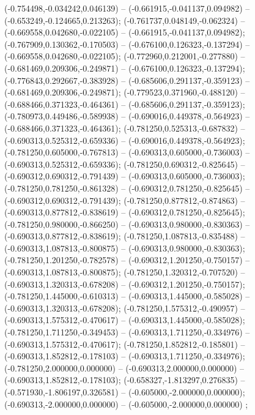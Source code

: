  (-0.754498,-0.034242,0.046139) -- (-0.661915,-0.041137,0.094982) -- (-0.653249,-0.124665,0.213263);
 (-0.761737,0.048149,-0.062324) -- (-0.669558,0.042680,-0.022105) -- (-0.661915,-0.041137,0.094982);
 (-0.767909,0.130362,-0.170503) -- (-0.676100,0.126323,-0.137294) -- (-0.669558,0.042680,-0.022105);
 (-0.772960,0.212001,-0.277880) -- (-0.681469,0.209306,-0.249871) -- (-0.676100,0.126323,-0.137294);
 (-0.776843,0.292667,-0.383928) -- (-0.685606,0.291137,-0.359123) -- (-0.681469,0.209306,-0.249871);
 (-0.779523,0.371960,-0.488120) -- (-0.688466,0.371323,-0.464361) -- (-0.685606,0.291137,-0.359123);
 (-0.780973,0.449486,-0.589938) -- (-0.690016,0.449378,-0.564923) -- (-0.688466,0.371323,-0.464361);
 (-0.781250,0.525313,-0.687832) -- (-0.690313,0.525312,-0.659336) -- (-0.690016,0.449378,-0.564923);
 (-0.781250,0.605000,-0.767813) -- (-0.690313,0.605000,-0.736003) -- (-0.690313,0.525312,-0.659336);
 (-0.781250,0.690312,-0.825645) -- (-0.690312,0.690312,-0.791439) -- (-0.690313,0.605000,-0.736003);
 (-0.781250,0.781250,-0.861328) -- (-0.690312,0.781250,-0.825645) -- (-0.690312,0.690312,-0.791439);
 (-0.781250,0.877812,-0.874863) -- (-0.690313,0.877812,-0.838619) -- (-0.690312,0.781250,-0.825645);
 (-0.781250,0.980000,-0.866250) -- (-0.690313,0.980000,-0.830363) -- (-0.690313,0.877812,-0.838619);
 (-0.781250,1.087813,-0.835488) -- (-0.690313,1.087813,-0.800875) -- (-0.690313,0.980000,-0.830363);
 (-0.781250,1.201250,-0.782578) -- (-0.690312,1.201250,-0.750157) -- (-0.690313,1.087813,-0.800875);
 (-0.781250,1.320312,-0.707520) -- (-0.690313,1.320313,-0.678208) -- (-0.690312,1.201250,-0.750157);
 (-0.781250,1.445000,-0.610313) -- (-0.690313,1.445000,-0.585028) -- (-0.690313,1.320313,-0.678208);
 (-0.781250,1.575312,-0.490957) -- (-0.690313,1.575312,-0.470617) -- (-0.690313,1.445000,-0.585028);
 (-0.781250,1.711250,-0.349453) -- (-0.690313,1.711250,-0.334976) -- (-0.690313,1.575312,-0.470617);
 (-0.781250,1.852812,-0.185801) -- (-0.690313,1.852812,-0.178103) -- (-0.690313,1.711250,-0.334976);
 (-0.781250,2.000000,0.000000) -- (-0.690313,2.000000,0.000000) -- (-0.690313,1.852812,-0.178103);
 (-0.658327,-1.813297,0.276835) -- (-0.571930,-1.806197,0.326581) -- (-0.605000,-2.000000,0.000000);
 (-0.690313,-2.000000,0.000000) -- (-0.605000,-2.000000,0.000000) ;
